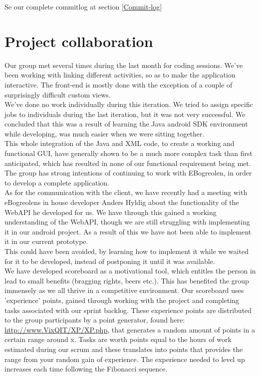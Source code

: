 \documentclass[12pt]{article}
\begin{document}
Se our complete commitlog at section \ref{Commit-log}
\section{Project collaboration}

Our group met several times during the last month for coding sessions. We've been working with linking different activities, so as to make the application interactive. The front-end is mostly done with the exception of a couple of surprisingly difficult custom views. \\
We've done no work individually during this iteration. We tried to assign specific jobs to individuals during the last iteration, but it was not very successful. We concluded that this was a result of learning the Java android SDK environment while developing, was much easier when we were sitting together.\\ 
This whole integration of the Java and XML code, to create a working and functional GUI, have generally shown to be a much more complex task than first anticipated, which has resulted in none of our functional requirement being met. The group has strong intentions of continuing to work with EBogreolen, in order to develop a complete application.\\

As for the communication with the client, we have recently had a meeting with eBogreolens in house developer Anders Hyldig about the functionality of the WebAPI he developed for us. We have through this gained a working understanding of the WebAPI, though we are still struggling with implementing it in our android project. As a result of this we have not been able to implement it in our current prototype.\\
This could have been avoided, by learning how to implement it while we waited for it to be developed, instead of postponing it until it was available.\\ 

We have developed scoreboard as a motivational tool, which entitles the person in lead to small benefits (bragging rights, beers etc.). This has benefited the group immensely as we all thrive in a competitive environment. Our scoreboard uses 'experience' points, gained through working with the project and completing tasks associated with our sprint backlog. These experience points are distributed to the group participants by a point generator, found here: \url{http://www.VixQIT/XP/XP.php}, that generates a random amount of points in a certain range around x. Tasks are worth points equal to the hours of work estimated during our scrum and these translates into points that provides the range from your random gain of experience. The experience needed to level up increases each time following the Fibonacci sequence.\\
\\
\end{document}
